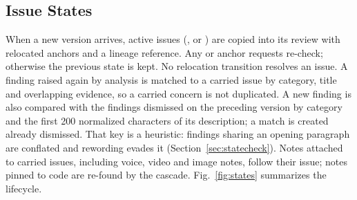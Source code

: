 

\subsection{Issue States}
When a new version arrives, active issues (,  or ) are copied into its review with relocated anchors and a lineage reference. Any  or  anchor requests re-check; otherwise the previous state is kept. No relocation transition resolves an issue. A finding raised again by analysis is matched to a carried issue by category, title and overlapping evidence, so a carried concern is not duplicated. A new finding is also compared with the findings dismissed on the preceding version by category and the first 200 normalized characters of its description; a match is created already dismissed. That key is a heuristic: findings sharing an opening paragraph are conflated and rewording evades it (Section~\ref{sec:statecheck}). Notes attached to carried issues, including voice, video and image notes, follow their issue; notes pinned to code are re-found by the cascade. Fig.~\ref{fig:states} summarizes the lifecycle.

